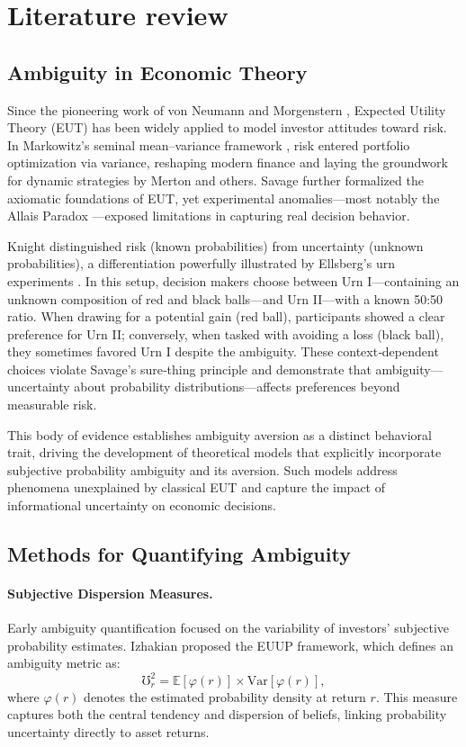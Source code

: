 \documentclass[preprint,12pt,authoryear]{elsarticle}
\begin{document}
\section{Literature review}

\subsection{Ambiguity in Economic Theory}
Since the pioneering work of von Neumann and Morgenstern \cite{neumann1947}, Expected Utility Theory (EUT) has been widely applied to model investor attitudes toward risk. In Markowitz’s seminal mean–variance framework \cite{markowitz1952}, risk entered portfolio optimization via variance, reshaping modern finance and laying the groundwork for dynamic strategies by Merton \cite{merton1971} and others. Savage \cite{savage1954} further formalized the axiomatic foundations of EUT, yet experimental anomalies—most notably the Allais Paradox \cite{allais1953}—exposed limitations in capturing real decision behavior.

Knight \cite{knight1921} distinguished risk (known probabilities) from uncertainty (unknown probabilities), a differentiation powerfully illustrated by Ellsberg’s urn experiments \cite{ellsberg1961}. In this setup, decision makers choose between Urn I—containing an unknown composition of red and black balls—and Urn II—with a known 50:50 ratio. When drawing for a potential gain (red ball), participants showed a clear preference for Urn II; conversely, when tasked with avoiding a loss (black ball), they sometimes favored Urn I despite the ambiguity. These context‑dependent choices violate Savage’s sure‑thing principle and demonstrate that ambiguity—uncertainty about probability distributions—affects preferences beyond measurable risk.

This body of evidence establishes ambiguity aversion as a distinct behavioral trait, driving the development of theoretical models that explicitly incorporate subjective probability ambiguity and its aversion. Such models address phenomena unexplained by classical EUT and capture the impact of informational uncertainty on economic decisions.


\subsection{Methods for Quantifying Ambiguity}

\paragraph{Subjective Dispersion Measures.} Early ambiguity quantification focused on the variability of investors’ subjective probability estimates. Izhakian \cite{izhakian2020} proposed the EUUP framework, which defines an ambiguity metric as:
\begin{equation}
\mho^2_r = \mathbb{E}[\varphi(r)] \times \mathrm{Var}[\varphi(r)],
\end{equation}
where $\varphi(r)$ denotes the estimated probability density at return $r$. This measure captures both the central tendency and dispersion of beliefs, linking probability uncertainty directly to asset returns.
\end{document}

